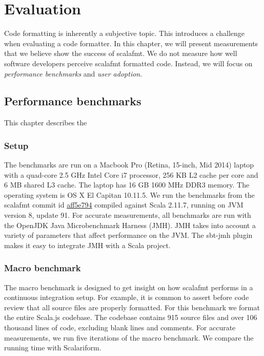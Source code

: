 \section{Evaluation}\label{sec:evaluation}
Code formatting is inherently a subjective topic.
This introduces a challenge when evaluating a code formatter.
In this chapter, we will present measurements that we believe show the success of scalafmt.
We do not measure how well software developers perceive scalafmt formatted code.
Instead, we will focus on \emph{performance benchmarks} and \emph{user adoption}.

\subsection{Performance benchmarks}
This chapter describes the 

\subsubsection{Setup}
The benchmarks are run on a Macbook Pro (Retina, 15-inch, Mid 2014) laptop with a quad-core 2.5 GHz Intel Core i7 processor, 256 KB L2 cache per core and 6 MB shared L3 cache.
The laptop has 16 GB 1600 MHz DDR3 memory.
The operating system is OS X El Capitan 10.11.5.
We run the benchmarks from the scalafmt commit id \href{https://github.com/olafurpg/scalafmt/tree/aff5e794dae4787b08243f8abb87a3ca4d907e40}{aff5e794} compiled against Scala 2.11.7, running on JVM version 8, update 91.
For accurate measurements, all benchmarks are run with the OpenJDK Java Microbenchmark Harness (JMH)\autocite{OpenJ38:online}.
JMH takes into account a variety of parameters that affect performance on the JVM.
The sbt-jmh\autocite{ktoso84:online} plugin makes it easy to integrate JMH with a Scala project.

\subsubsection{Macro benchmark}
The macro benchmark is designed to get insight on how scalafmt performs in a continuous integration setup.
For example, it is common to assert before code review that all source files are properly formatted.
For this benchmark we format the entire Scala.js codebase.
The codebase contains 915 source files and over 106 thousand lines of code, excluding blank lines and comments.
For accurate measurements, we run five iterations of the macro benchmark.
We compare the running time with Scalariform.

